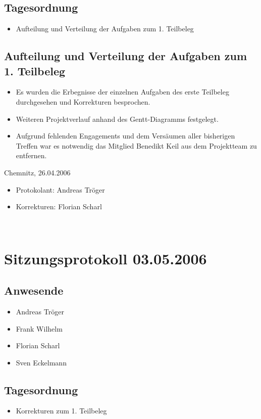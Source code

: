 		\subsection{Tagesordnung}
		\begin{itemize}
			\item Aufteilung und Verteilung der Aufgaben zum 1. Teilbeleg
		\end{itemize}
			\subsection{Aufteilung und Verteilung der Aufgaben zum 1. Teilbeleg}
			\begin{itemize}
				\item Es wurden die Erbegnisse der einzelnen Aufgaben des erste Teilbeleg durchgesehen und Korrekturen besprochen.
				\item Weiteren Projektverlauf anhand des Gentt-Diagramms festgelegt.
				\item Aufgrund fehlenden Engagements und dem Versäumen aller bisherigen Treffen war es notwendig das Mitglied Benedikt Keil aus dem Projektteam zu entfernen. 
			\end{itemize}
			Chemnitz, 26.04.2006
			\begin{itemize}
				\item Protokolant: Andreas Tröger
				\item Korrekturen: Florian Scharl
			\end{itemize}
\newpage
﻿
		\section{Sitzungsprotokoll 03.05.2006}
		\subsection{Anwesende}
		\begin{itemize}
			\item Andreas Tröger
			\item Frank Wilhelm
			\item Florian Scharl
			\item Sven Eckelmann
		\end{itemize}
		\subsection{Tagesordnung}
		\begin{itemize}
			\item Korrekturen zum 1. Teilbeleg
		\end{itemize}
